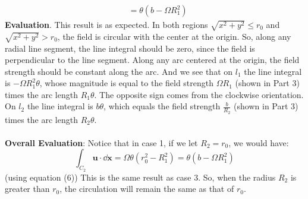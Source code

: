 \documentclass{article}
\begin{document}
\begin{enumerate}
\begin{enumerate}
\begin{align*}
        &= \theta (b - \Omega R_1^2)
      \end{align*}
      \textbf{Evaluation}. This result is as expected. In both regions \(\sqrt{x^2+y^2}\le r_0\) and \(\sqrt{x^2+y^2}> r_0\),
      the field is circular with the center at the origin.
      So, along any radial line segment, the line integral should be zero, since the field is perpendicular to the line segment. Along any arc centered at the origin, the field strength should be constant along the arc. And we see that on \(l_1\)
      the line integral is \(-\Omega R_1^2\theta\), whose magnitude is equal to the field strength \(\Omega R_1\) (shown in Part 3) times the arc length
      \(R_1\theta\). The opposite sign comes from the clockwise orientation. On \(l_2\) the line integral is \(b\theta \),
      which equals the field strength \(\frac{b}{R_2}\) (shown in Part 3) times the arc length \(R_2\theta\).\\
      \\
      \textbf{Overall Evaluation}: Notice that in case 1, if we let \(R_2=r_0\), we would have:
      \begin{equation}
        \int_{C_2} \mathbf{u}\cdot \dd \mathbf{x}= \Omega \theta (r_0^2 - R_1^2) = \theta (b - \Omega R_1^2)
      \end{equation}
      (using equation (6))
      This is the same result as case 3. So, when the radius \(R_2\) is greater than \(r_0\), the circulation will remain the same as
      that of \(r_0\). 
\end{enumerate}\text{ }\\
\pagebreak \\ \\


\end{enumerate}
\end{document}
